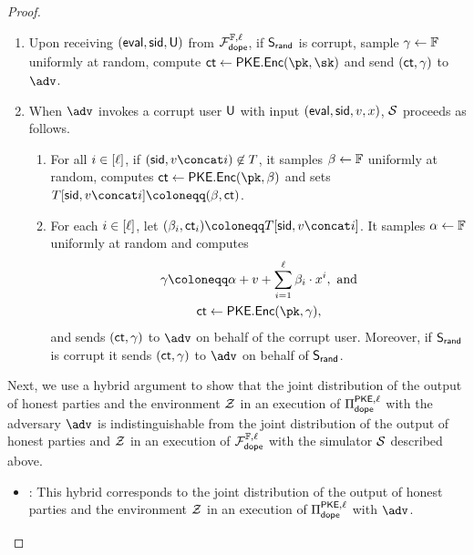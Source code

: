 \begin{proof}
\begin{techbox}
\begin{enumerate}
			\item Upon receiving $(\eval, \sid, \user)$ from $\fdope[\ell]$, if $\randserver$ is corrupt, sample $\dopemaskedshare \gets \field$ uniformly at random, compute $\dopectmasked \gets \encscheme.\Enc(\pk, \sk)$ and send $(\dopectmasked, \dopemaskedshare)$ to $\adv$.

			\item When $\adv$ invokes a corrupt user $\user$ with input $(\eval, \sid, \val, x)$, $\simulator$ proceeds as follows.
			      \begin{enumerate}
				      \item For all $i \in \nrange{\ell}$, if $(\sid, \val \concat i) \not\in T$, it samples $\polycoeff \gets \field$ uniformly at random, computes $\ct \gets \encscheme.\Enc(\pk, \polycoeff)$ and sets $T[\sid, \val \concat i] \coloneqq (\polycoeff, \ct)$.

				      \item For each $i \in \nrange{\ell}$, let $(\polycoeff_i, \ct_i) \coloneqq T[\sid, \val \concat i]$.
				            It samples $\dopemask \gets \field$ uniformly at random and computes
				            \begin{gather*}
					            \dopemaskedshare \coloneqq \dopemask + \val + \sum_{i=1}^\ell \polycoeff_i \cdot x^i, \text{ and} \\
					            \dopectmasked \gets \encscheme.\Enc(\pk, \dopemaskedshare),
				            \end{gather*}
				            and sends $(\dopectmasked, \dopemaskedshare)$ to $\adv$ on behalf of the corrupt user.
				            Moreover, if $\randserver$ is corrupt it sends $(\dopectmasked, \dopemaskedshare)$ to $\adv$ on behalf of $\randserver$.
			      \end{enumerate}
		\end{enumerate}
	\end{techbox}

	Next, we use a hybrid argument to show that the joint distribution of the output of honest parties and the environment $\env$ in an execution of $\pdope[\ell]$ with the adversary $\adv$ is indistinguishable from the joint distribution of the output of honest parties and $\env$ in an execution of $\fdope[\ell]$ with the simulator $\simulator$ described above.

	\begin{itemize}[leftmargin=*]
		\item \newhyb: This hybrid corresponds to the joint distribution of the output of honest parties and the environment $\env$ in an execution of $\pdope[\ell]$ with $\adv$.


\end{itemize}
\end{proof}
